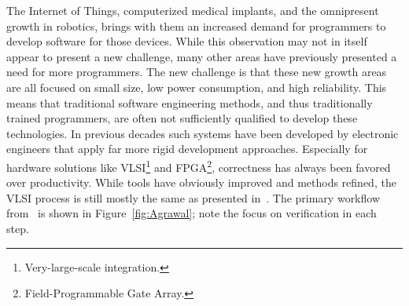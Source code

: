 The Internet of Things, computerized medical implants, and the omnipresent growth in robotics, brings with them an increased demand for programmers to develop software for those devices. While this observation may not in itself appear to present a new challenge, many other areas have previously presented a need for more programmers. The new challenge is that these new growth areas are all focused on small size, low power consumption, and high reliability. This means that traditional software engineering methods, and thus traditionally trained programmers, are often not sufficiently qualified to develop these technologies.
In previous decades such systems have been developed by electronic engineers that apply far more rigid development approaches. Especially for hardware solutions like VLSI\footnote{Very-large-scale integration.} and FPGA\footnote{Field-Programmable Gate Array.}, correctness has always been favored over productivity.
While tools have obviously improved and methods refined, the VLSI process is still mostly the same as presented in~\cite{Agrawal:1985:VDP:320599.322570}. The primary workflow from~\cite{Agrawal:1985:VDP:320599.322570} is shown in Figure~\ref{fig:Agrawal}; note the focus on verification in each step.
